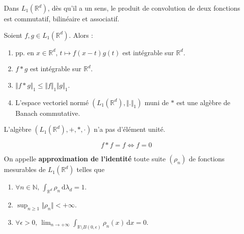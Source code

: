   \begin{proposition}
    Dans $L_1(\mathbb{R}^d)$, dès qu'il a un sens, le produit de convolution de deux fonctions est commutatif, bilinéaire et associatif.
  \end{proposition}

  \begin{theorem}
    Soient $f, g \in L_1(\mathbb{R}^d)$. Alors :
    \begin{enumerate}[label=(\roman*)]
      \item pp. en $x \in \mathbb{R}^d$, $t \mapsto f(x-t)g(t)$ est intégrable sur $\mathbb{R}^d$.
      \item $f * g$ est intégrable sur $\mathbb{R}^d$.
      \item $\Vert f * g \Vert_1 \leq \Vert f \Vert_1 \Vert g \Vert_1$.
      \item L'espace vectoriel normé $(L_1(\mathbb{R}^d), \Vert . \Vert_1)$ muni de $*$ est une algèbre de Banach commutative.
    \end{enumerate}
  \end{theorem}


  \begin{proposition}
    L'algèbre $(L_1(\mathbb{R}^d), +, *, \cdot)$ n'a pas d'élément unité.
  \end{proposition}

  \begin{application}
    \[ f * f = f \iff f = 0 \]
  \end{application}


  \begin{definition}
    On appelle \textbf{approximation de l'identité} toute suite $(\rho_n)$ de fonctions mesurables de $L_1(\mathbb{R}^d)$ telles que
    \begin{enumerate}[label=(\roman*)]
      \item $\forall n \in \mathbb{N}, \, \int_{\mathbb{R}^d} \rho_n \, \mathrm{d}\lambda_d = 1$.
      \item $\sup_{n \geq 1} \Vert \rho_n \Vert < +\infty$.
      \item $\forall \epsilon > 0, \, \lim_{n \rightarrow +\infty} \int_{\mathbb{R} \setminus B(0, \epsilon)} \rho_n(x) \, \mathrm{d}x = 0$.
    \end{enumerate}
  \end{definition}

